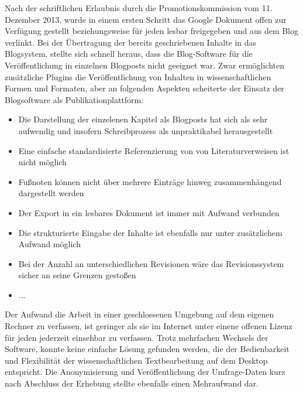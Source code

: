Nach der schriftlichen Erlaubnis durch die Promotionskommission vom 11. Dezember 2013, wurde in einem ersten Schritt das Google Dokument offen zur Verfügung gestellt beziehungsweise für jeden lesbar freigegeben und aus dem Blog verlinkt. Bei der Übertragung der bereits geschriebenen Inhalte in das Blogsystem, stellte sich schnell heraus, dass die Blog-Software für die Veröffentlichung in einzelnen Blogposts nicht geeignet war. Zwar ermöglichten zusätzliche Plugins die Veröffentlichung von Inhalten in wissenschaftlichen Formen und Formaten, aber an folgenden Aspekten scheiterte der Einsatz der Blogsoftware als Publikationplattform:
\begin{itemize}
\item Die Darstellung der einzelenen Kapitel als Blogposts hat sich als sehr aufwendig und insofern Schreibprozess als unpraktikabel herausgestellt
\item Eine einfache standardisierte Referenzierung von von Literaturverweisen ist nicht möglich
\item Fußnoten können nicht über mehrere Einträge hinweg zusammenhängend dargestellt werden
\item Der Export in ein lesbares Dokument ist immer mit Aufwand verbunden
\item Die strukturierte Eingabe der Inhalte ist ebenfalls nur unter zusätzlichem Aufwand möglich
\item Bei der Anzahl an unterschiedlichen Revisionen wäre das Revisionssystem sicher an seine Grenzen gestoßen
\item ...
\end{itemize}

Der Aufwand die Arbeit in einer geschlossenen Umgebung auf dem eigenen Rechner zu verfassen, ist geringer als sie im Internet unter einene offenen Lizenz für jeden jederzeit einsehbar zu verfassen. Trotz mehrfachen Wechsels der Software, konnte keine einfache Lösung gefunden werden, die der Bedienbarkeit und Flexibilität der wissenschaftlichen Textbearbeitung auf dem Desktop entspricht. Die Anonymisierung und Veröffentlichung der Umfrage-Daten kurz nach Abschluss der Erhebung stellte ebenfalls einen Mehraufwand dar.
